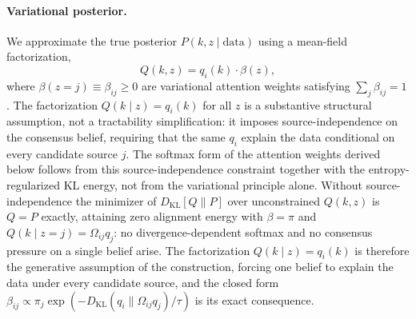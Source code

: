 \documentclass[11pt]{article}
\begin{document}
\paragraph{Variational posterior.}
We approximate the true posterior $P(k, z \mid \text{data})$ using a mean-field factorization,
\begin{equation}
Q(k, z) = q_i(k) \cdot \beta(z),
\label{eq:mixture_posterior}
\end{equation}
where $\beta(z = j) \equiv \beta_{ij} \geq 0$ are variational attention weights satisfying $\sum_j \beta_{ij} = 1$. The factorization $Q(k \mid z) = q_i(k)$ for all $z$ is a substantive structural assumption, not a tractability simplification: it imposes source-independence on the consensus belief, requiring that the same $q_i$ explain the data conditional on every candidate source $j$. The softmax form of the attention weights derived below follows from this source-independence constraint together with the entropy-regularized KL energy, not from the variational principle alone. Without source-independence the minimizer of $D_{\mathrm{KL}}[Q \| P]$ over unconstrained $Q(k,z)$ is $Q = P$ exactly, attaining zero alignment energy with $\beta = \pi$ and $Q(k \mid z{=}j) = \Omega_{ij}q_j$: no divergence-dependent softmax and no consensus pressure on a single belief arise. The factorization $Q(k \mid z) = q_i(k)$ is therefore the generative assumption of the construction, forcing one belief to explain the data under every candidate source, and the closed form $\beta_{ij} \propto \pi_j \exp(-D_{\mathrm{KL}}(q_i \| \Omega_{ij}q_j)/\tau)$ is its exact consequence.
\end{document}
